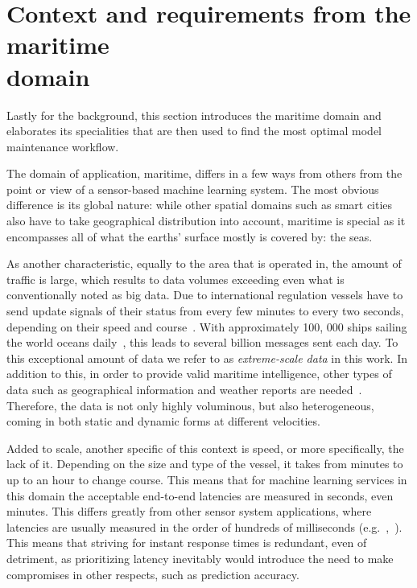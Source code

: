 \section[Context and requirements from the maritime domain]{Context and requirements from the maritime\\ domain}

Lastly for the background, this section introduces the maritime domain and elaborates its specialities that are then used to find the most optimal model maintenance workflow.

The domain of application, maritime, differs in a few ways from others from the point or view of a sensor-based machine learning system. The most obvious difference is its global nature: while other spatial domains such as smart cities also have to take geographical distribution into account, maritime is special as it encompasses all of what the earths' surface mostly is covered by: the seas. 

As another characteristic, equally to the area that is operated in, the amount of traffic is large, which results to data volumes exceeding even what is conventionally noted as big data. Due to international regulation vessels have to send update signals of their status from every few minutes to every two seconds, depending on their speed and course~\cite{maritimeinformatics}. With approximately 100, 000 ships sailing the world oceans daily~\cite{maritimeinformatics}, this leads to several billion messages sent each day. To this exceptional amount of data we refer to as \textit{extreme-scale data} in this work. In addition to this, in order to provide valid maritime intelligence, other types of data such as geographical information and weather reports are needed~\cite{D1.1}. Therefore, the data is not only highly voluminous, but also heterogeneous, coming in both static and dynamic forms at different velocities.

Added to scale, another specific of this context is speed, or more specifically, the lack of it. Depending on the size and type of the vessel, it takes from minutes to up to an hour to change course. This means that for machine learning services in this domain the acceptable end-to-end latencies are measured in seconds, even minutes. This differs greatly from other sensor system applications, where latencies are usually measured in the order of hundreds of milliseconds (e.g.~\cite{facebook},~\cite{edgelatency}). This means that striving for instant response times is redundant, even of detriment, as prioritizing latency inevitably would introduce the need to make compromises in other respects, such as prediction accuracy.

